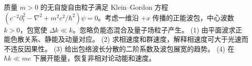 质量 \(m>0\) 的无自旋自由粒子满足 Klein--Gordon 方程 \((c^{-2}\partial_t^2-\nabla^2+m^2c^2/\hbar^2)\psi=0\)。考虑一维沿 \(+x\) 传播的正能波包，中心波数 \(k>0\)，包宽使 \(\Delta k\ll k\)。忽略负能态混合及量子场粒子产生。
(1) 由平面波求正能色散关系、静能及动量对应。
(2) 求相速度和群速度，解释相速度可大于光速而不违反因果性。
(3) 给出包络波长分散的二阶系数及波包展宽的趋势。
(4) 在 \(\hbar k\ll mc\) 下展开能量，恢复非相对论动能和速度。
